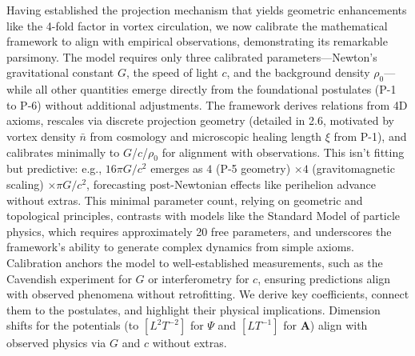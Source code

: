 Having established the projection mechanism that yields geometric enhancements like the 4-fold factor in vortex circulation, we now calibrate the mathematical framework to align with empirical observations, demonstrating its remarkable parsimony. The model requires only three calibrated parameters---Newton's gravitational constant $G$, the speed of light $c$, and the background density $\rho_0$---while all other quantities emerge directly from the foundational postulates (P-1 to P-6) without additional adjustments. The framework derives relations from 4D axioms, rescales via discrete projection geometry (detailed in 2.6, motivated by vortex density $\bar{n}$ from cosmology and microscopic healing length $\xi$ from P-1), and calibrates minimally to $G$/$c$/$\rho_0$ for alignment with observations. This isn't fitting but predictive: e.g., $16\pi G/c^2$ emerges as $4$ (P-5 geometry) $\times 4$ (gravitomagnetic scaling) $\times \pi G/c^2$, forecasting post-Newtonian effects like perihelion advance without extras. This minimal parameter count, relying on geometric and topological principles, contrasts with models like the Standard Model of particle physics, which requires approximately 20 free parameters, and underscores the framework's ability to generate complex dynamics from simple axioms. Calibration anchors the model to well-established measurements, such as the Cavendish experiment for $G$ or interferometry for $c$, ensuring predictions align with observed phenomena without retrofitting. We derive key coefficients, connect them to the postulates, and highlight their physical implications. Dimension shifts for the potentials (to $[L^2 T^{-2}]$ for $\Psi$ and $[L T^{-1}]$ for $\mathbf{A}$) align with observed physics via $G$ and $c$ without extras.

